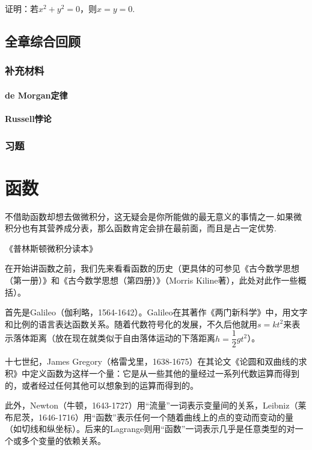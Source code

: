 \documentclass[lang=cn,math=cm,chinesefont=nofont,11pt,scheme=chinese,onecol]{elegantbook}
\begin{document}
\begin{exercise}\label{2003RJA_xx2-1_P7.exp4}
  证明：若$x^2+y^2=0$，则$x=y=0$.
\end{exercise}

\section{全章综合回顾}

\subsection{补充材料}

\subsubsection{de Morgan定律}

\subsubsection{Russell悖论}

\subsection{习题}

\chapter{函数}

\epigraph{不借助函数却想去做微积分，这无疑会是你所能做的最无意义的事情之一.如果微积分也有其营养成分表，那么函数肯定会排在最前面，而且是占一定优势.}{《普林斯顿微积分读本》}

在开始讲函数之前，我们先来看看函数的历史（更具体的可参见《古今数学思想（第一册）》和《古今数学思想（第四册）》（Morris Kiline著），此处对此作一些概括）。

首先是Galileo（伽利略，1564-1642）。Galileo在其著作《两门新科学》中，用文字和比例的语言表达函数关系。随着代数符号化的发展，不久后他就用$s=kt^2$来表示落体距离（放在现在就类似于自由落体运动的下落距离$h=\dfrac{1}{2}gt^2$）。

十七世纪，James Gregory（格雷戈里，1638-1675）在其论文《论圆和双曲线的求积》中定义函数为这样一个量：它是从一些其他的量经过一系列代数运算而得到的，或者经过任何其他可以想象到的运算而得到的。

此外，Newton（牛顿，1643-1727）用“流量”一词表示变量间的关系，Leibniz（莱布尼茨，1646-1716）用“函数”表示任何一个随着曲线上的点的变动而变动的量（如切线和纵坐标）。后来的Lagrange则用“函数”一词表示几乎是任意类型的对一个或多个变量的依赖关系。
\end{document}
